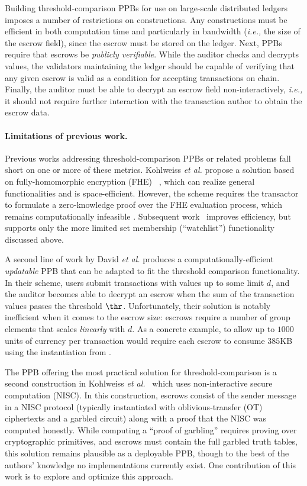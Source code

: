 Building threshold-comparison PPBs for use on large-scale distributed ledgers imposes a number of restrictions on  constructions.
Any constructions must be efficient in both computation time and particularly in bandwidth (\emph{i.e.,} the size of the escrow field), since the escrow must be stored on the ledger.
Next, PPBs require that escrows be \emph{publicly verifiable}.
While the auditor checks and decrypts values, the validators maintaining the ledger should be capable of verifying that any given escrow is valid as a condition for accepting transactions on chain.
Finally, the auditor must be able to decrypt an escrow field non-interactively, {\em i.e.,} it should not require further interaction with the transaction author to obtain the escrow data.

\paragraph{Limitations of previous work.}
Previous works addressing threshold-comparison PPBs or related problems fall short on one or more of these metrics.
Kohlweiss \emph{et al.} propose a solution based on fully-homomorphic encryption (FHE)~ \cite{EC:KohLysNgu23}, which can realize general functionalities and is space-efficient.
However, the scheme requires the transactor to formulate a zero-knowledge proof over the FHE evaluation process, which remains computationally infeasible \cite{viand2023verifiable}.
Subsequent work~\cite{EPRINT:GKLS24} improves efficiency, but supports only the more limited set membership (``watchlist'') functionality discussed above.

A second line of work by David \emph{et al.} \cite{AC:DEFKPV24} produces a computationally-efficient \emph{updatable} PPB that can be adapted to fit the threshold comparison functionality.
In their scheme, users submit transactions with values up to some limit $d$, and the auditor becomes able to decrypt an escrow when the sum of the transaction values passes the threshold $\thr$.
Unfortunately, their solution is notably inefficient when it comes to the escrow size: escrows require a number of group elements that scales \emph{linearly} with $d$.
As a concrete example, to allow up to $1000$ units of currency per transaction would require each escrow to consume $385$KB using the instantiation from \cite[\S8]{AC:DEFKPV24}.

The PPB offering the most practical solution for threshold-comparison is a second construction in Kohlweiss \emph{et al.}~\cite{EC:KohLysNgu23} which uses non-interactive secure computation (NISC).
In this construction, escrows consist of the sender message in a NISC protocol (typically instantiated with oblivious-transfer (OT) ciphertexts and a garbled circuit) along with a proof that the NISC was computed honestly.
While computing a ``proof of garbling'' requires proving over cryptographic primitives, and escrows must contain the full garbled truth tables, this solution remains plausible as a deployable PPB, though to the best of the authors' knowledge no implementations currently exist.
One contribution of this work is to explore and optimize this approach.

